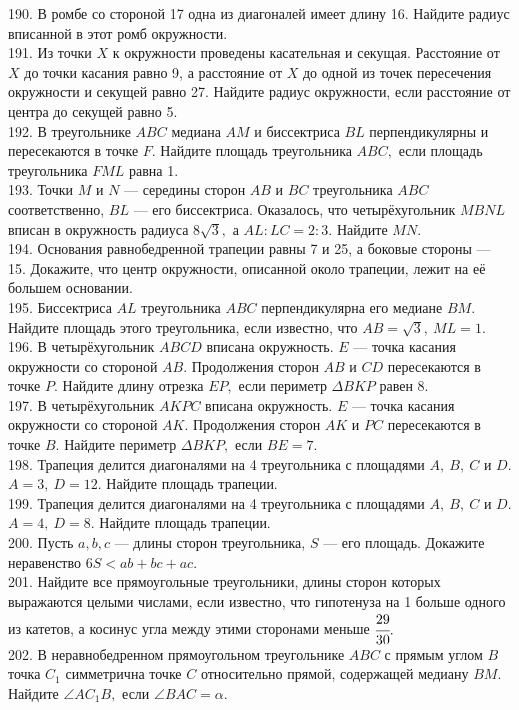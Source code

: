 190. В ромбе со стороной 17 одна из диагоналей имеет длину 16. Найдите радиус вписанной в этот ромб окружности.\\
191. Из точки $X$ к окружности проведены касательная и секущая. Расстояние от $X$ до точки касания равно 9, а расстояние от $X$ до одной из точек пересечения окружности и секущей равно 27. Найдите радиус окружности, если расстояние от центра до секущей равно 5.\\
192. В треугольнике $ABC$ медиана $AM$ и биссектриса $BL$ перпендикулярны и пересекаются в точке $F.$ Найдите площадь треугольника $ABC,$ если площадь треугольника $FML$ равна 1.\\
193. Точки $M$ и $N$ --- середины сторон $AB$ и $BC$ треугольника $ABC$ соответственно, $BL$ --- его биссектриса. Оказалось, что четырёхугольник $MBNL$ вписан в окружность радиуса $8\sqrt{3},$ а $AL:LC=2:3.$ Найдите $MN.$\\
194. Основания равнобедренной трапеции равны 7 и 25, а боковые стороны --- 15. Докажите, что центр окружности, описанной около трапеции, лежит на её большем основании.\\
195. Биссектриса $AL$ треугольника $ABC$ перпендикулярна его медиане $BM.$ Найдите площадь этого треугольника, если известно, что $AB=\sqrt{3},\ ML=1.$\\
196. В четырёхугольник $ABCD$ вписана окружность. $E$ --- точка касания окружности со стороной $AB.$ Продолжения сторон $AB$ и $CD$ пересекаются в точке $P.$ Найдите длину отрезка $EP,$ если периметр $\Delta BKP$ равен 8.\\
197. В четырёхугольник $AKPC$ вписана окружность. $E$ --- точка касания окружности со стороной $AK.$ Продолжения сторон $AK$ и $PC$ пересекаются в точке $B.$ Найдите периметр $\Delta BKP,$ если $BE=7.$\\
198. Трапеция делится диагоналями на 4 треугольника с площадями $A,\ B,\ C$ и $D.$ $A=3,\ D=12.$ Найдите площадь трапеции.\\
199. Трапеция делится диагоналями на 4 треугольника с площадями $A,\ B,\ C$ и $D.$ $A=4,\ D=8.$ Найдите площадь трапеции.\\
200. Пусть $a,b,c$ --- длины сторон треугольника, $S$ --- его площадь. Докажите неравенство $6S<ab+bc+ac.$\\
201. Найдите все прямоугольные треугольники, длины сторон которых выражаются целыми числами, если известно, что гипотенуза на 1 больше одного из катетов, а косинус угла между этими сторонами меньше $\cfrac{29}{30}.$\\
202. В неравнобедренном прямоугольном треугольнике $ABC$ с прямым углом $B$ точка $C_1$ симметрична точке $C$ относительно прямой, содержащей медиану $BM.$ Найдите $\angle AC_1B,$ если $\angle BAC=\alpha.$\\
